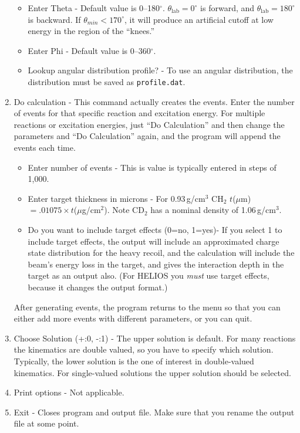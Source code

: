 \begin{singlespace}
\begin{enumerate}
		\begin{itemize}
			\setlength{\itemsep}{0pt}
  		\setlength{\parskip}{0pt}
  		\setlength{\parsep}{0pt}
			\item \textsf{Enter Theta} - Default value is 0--180$^\circ$.  $\theta_\mathrm{lab}=0^\circ$ is forward, and $\theta_\mathrm{lab}=180^\circ$ is backward. If $\theta_{min}<170^\circ$, it will produce an artificial cutoff at low energy in the region of the ``knees.''
			\item \textsf{Enter Phi} - Default value is 0--360$^\circ$.
			\item \textsf{Lookup angular distribution profile?} - To use an angular distribution, the distribution must be saved as \texttt{profile.dat}.
		\end{itemize}
	\item \textsf{Do calculation} - This command actually creates the events. Enter the number of events for that specific reaction and excitation energy. For multiple reactions or excitation energies, just ``Do Calculation'' and then change the parameters and ``Do Calculation'' again, and the program will append the events each time.
		\begin{itemize}
			\setlength{\itemsep}{0pt}
  		\setlength{\parskip}{0pt}
  		\setlength{\parsep}{0pt}
			\item \textsf{Enter number of events} - This is value is typically entered in steps of 1,000.
			\item \textsf{Enter target thickness in microns} - For 0.93\,g/cm$^3$ CH$_2$ $t$($\mu$m)$=.01075\times t$($\mu$g/cm$^2$). Note CD$_2$ has a nominal density of 1.06\,g/cm$^3$.
			\item \textsf{Do you want to include target effects (0=no, 1=yes)}- If you select 1 to include target effects, the output will include an approximated charge state distribution for the heavy recoil, and the calculation will include the beam's energy loss in the target, and gives the interaction depth in the target as an output also. (For HELIOS you \textit{must} use target effects, because it changes the output format.)
		\end{itemize}
 After generating events, the program returns to the menu so that you can either add more events with different parameters, or you can quit.
\item \textsf{Choose Solution (+:0, -:1)} - The upper solution is default.  For many reactions the kinematics are double valued, so you have to specify which solution.  Typically, the lower solution is the one of interest in double-valued kinematics.  For single-valued solutions the upper solution should be selected.
\item \textsf{Print options} - Not applicable.
\item \textsf{Exit} - Closes program and output file. Make sure that you rename the output file at some point.
\end{enumerate}
\end{singlespace}
